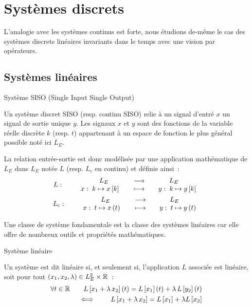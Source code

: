 \chapter{Systèmes discrets}


L'analogie avec les systèmes continus est forte, nous étudions de-même
le cas des systèmes discrets linéaires invariants dans le temps avec
une vision par opérateurs.


\section{Systèmes linéaires}

\begin{definition}{Système SISO (Single Input Single Output)}
  
  Un système discret SISO (resp. continu SISO) relie à un signal
  d'entré $x$ un signal de sortie unique $y$. Les signaux $x$ et $y$
  sont des fonctions de la variable réelle discrète $k$ (resp. $t$)
  appartenant à un espace de fonction le plus général possible noté
  ici $L_E$.

  La relation entrée-sortie est donc modélisée par une application
  mathématique de $L_E$ dans $L_E$ notée $L$ (resp. $L_c$ en continu)
  et définie ainsi~:
  \begin{eqnarray}
    L : \qquad \begin{array}{ccc} L_E & \longrightarrow & L_E \\ x : \; k\mapsto x\left[k\right]\quad{} & \longmapsto & \quad y :\; k\mapsto y\left[k\right] \\ \end{array} \\
    L_c: \qquad \begin{array}{ccc} L_E & \longrightarrow & L_E \\ x : \; t\mapsto x\left(t\right)\quad{} & \longmapsto & \quad y :\; t\mapsto y\left(t\right) \\ \end{array} 
  \end{eqnarray}
\end{definition}

Une classe de système fondamentale est la classe des systèmes
linéaires car elle offre de nombreux outils et propriétés
mathématiques.

\begin{definition}{Système linéaire}
  \label{def:linearite}
  
  Un système est dit linéaire si, et seulement si, l'application $L$
  associée est linéaire, soit pour tout
  $\left(x_1,x_2,\lambda\right) \in L_E^2 \times \mathbb{R}$~:
  \begin{eqnarray}
    \label{eq:def_linearite}
    \forall t \in \mathbb{R} \qquad L\left[x_1 + \lambda\, x_2\right](t) = L\left[x_1\right](t) + \lambda\,L\left[y_2\right](t) \nonumber\\
    \iff \qquad L\left[x_1 + \lambda\,x_2\right] = L\left[x_1\right] +\lambda L\left[x_2 \right]
  \end{eqnarray}
\end{definition}

